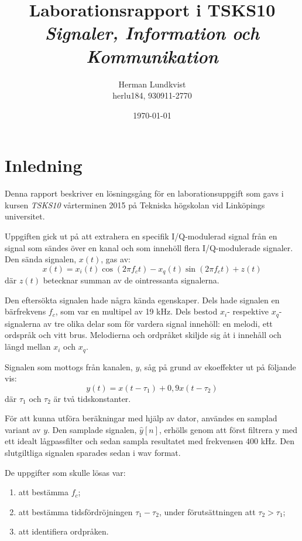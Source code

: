 \documentclass[10pt,twocolumn,a4paper]{article}
\title{Laborationsrapport i TSKS10 \emph{Signaler, Information och Kommunikation}}
\author{Herman Lundkvist \\ herlu184, 930911-2770 }
\date{\today}
\begin{document}
\newcommand{\yhat}{$\hat{y}[n]$\xspace}



\maketitle

\section{Inledning}

Denna rapport beskriver en lösningsgång för en laborationsuppgift som gavs i
kursen \emph{TSKS10} vårterminen 2015 på Tekniska högskolan vid Linköpings
universitet.

Uppgiften gick ut på att extrahera en specifik I/Q-modulerad signal från en signal som sändes
över en kanal och som innehöll flera I/Q-modulerade signaler. Den sända signalen, $x(t)$, gas av:
\begin{equation}
x(t) = x_i(t) \cos(2 \pi f_ct) - x_q(t) \sin(2 \pi f_c t) + z(t)
\label{e1}
\end{equation}
där $z(t)$ betecknar summan av de ointressanta signalerna.

Den eftersökta signalen hade några kända egenskaper. Dels hade signalen en
bärfrekvens $f_c$, som var en multipel av 19 kHz. Dels bestod $x_i$- respektive
$x_q$-signalerna av tre olika delar som för vardera signal innehöll: en melodi, ett ordspråk
och vitt brus. Melodierna och ordpråket skiljde sig åt i
innehåll och längd mellan $x_i$ och $x_q$.

Signalen som mottogs från kanalen, $y$, såg på grund av ekoeffekter ut på
följande vis:
\begin{equation}
    y(t)=x(t - \tau_1) + 0,9 x(t - \tau_2)
\end{equation}
där $\tau_1$ och $\tau_2$ är två tidskonstanter.

För att kunna utföra beräkningar med hjälp av dator, användes en samplad
variant av $y$. Den samplade signalen, \yhat, erhölls genom att först
filtrera y med ett idealt lågpassfilter och sedan sampla resultatet med
frekvensen 400 kHz. Den slutgiltliga signalen sparades sedan i wav format.

De uppgifter som skulle lösas var:
\begin{enumerate}
\item att bestämma $f_c$;
\item att bestämma tidsfördröjningen $\tau_1-\tau_2$, under förutsättningen att
$\tau_2 > \tau_1$;
\item att identifiera ordpråken.
\end{enumerate}
\end{document}

